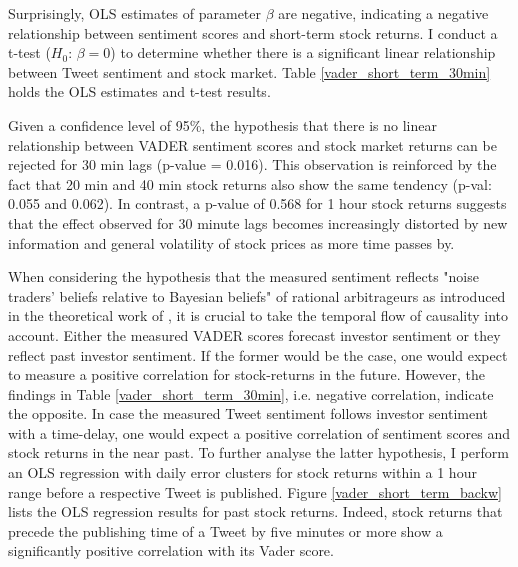 \documentclass[a4paper,12pt]{article}%
\begin{document}
Surprisingly, OLS estimates of parameter $\beta$ are negative, indicating a negative relationship between sentiment scores and short-term stock returns. I conduct a t-test ($H_0$: $\beta=0$) to determine whether there is a significant linear relationship between Tweet sentiment and stock market. Table \ref{vader_short_term_30min} holds the OLS estimates and t-test results.

Given a confidence level of 95\%, the hypothesis that there is no linear relationship between VADER sentiment scores and stock market returns can be rejected for 30 min lags (p-value = 0.016). This observation is reinforced by the fact that 20 min and 40 min stock returns also show the same tendency (p-val: 0.055 and 0.062). In contrast, a p-value of 0.568 for 1 hour stock returns suggests that the effect observed for 30 minute lags becomes increasingly distorted by new information and general volatility of stock prices as more time passes by.

When considering the hypothesis that the measured sentiment reflects "noise traders’ beliefs relative to Bayesian beliefs" \citep{Tetlock2007} of rational arbitrageurs as introduced in the theoretical work of \citet{DeLong1990}, it is crucial to take the temporal flow of causality into account. Either the measured VADER scores forecast investor sentiment or they reflect past investor sentiment. If the former would be the case, one would expect to measure a positive correlation for stock-returns in the future. However, the findings in Table \ref{vader_short_term_30min}, i.e. negative correlation, indicate the opposite. In case the measured Tweet sentiment follows investor sentiment with a time-delay, one would expect a positive correlation of sentiment scores and stock returns in the near past. To further analyse the latter hypothesis, I perform an OLS regression with daily error clusters for stock returns within a 1 hour range before a respective Tweet is published. Figure \ref{vader_short_term_backw} lists the OLS regression results for past stock returns. Indeed, stock returns that precede the publishing time of a Tweet by five minutes or more show a significantly positive correlation with its Vader score.
\end{document}
